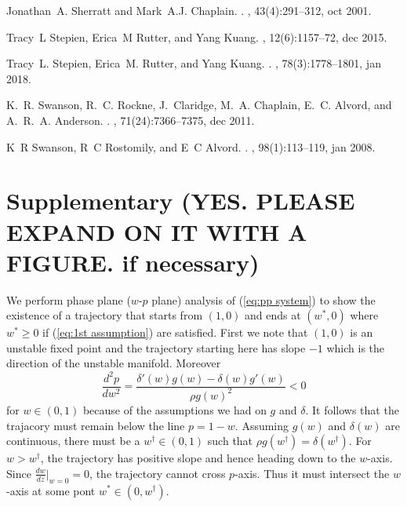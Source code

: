 \documentclass{aims}
\numberwithin{equation}{section}
\begin{document}
\begin{thebibliography}{10}
Jonathan~A. Sherratt and Mark~A.J. Chaplain.
.
, 43(4):291--312, oct 2001.

Tracy~L Stepien, Erica~M Rutter, and Yang Kuang.
, 12(6):1157--72,
  dec 2015.

Tracy~L. Stepien, Erica~M. Rutter, and Yang Kuang.
.
, 78(3):1778--1801, jan
  2018.

K.~R. Swanson, R.~C. Rockne, J.~Claridge, M.~A. Chaplain, E.~C. Alvord, and
  A.~R.~A. Anderson.
.
, 71(24):7366--7375, dec 2011.

K~R Swanson, R~C Rostomily, and E~C Alvord.
.
, 98(1):113--119, jan 2008.

\end{thebibliography}

\section*{Supplementary (YES. PLEASE EXPAND ON IT WITH A FIGURE. if necessary)}

We perform phase plane ($w$-$p$ plane) analysis of (\ref{eq:pp system})
to show the existence of a trajectory that starts from $(1,0)$ and
ends at $(w^{*},0)$ where $w^{*}\ge0$ if (\ref{eq:1st assumption})
are satisfied. First we note that $(1,0)$ is an unstable fixed point
and the trajectory starting here has slope $-1$ which is the direction
of the unstable manifold. Moreover 
\[
\frac{d^{2}p}{dw^{2}}=\frac{\delta'(w)g(w)-\delta(w)g'(w)}{\rho g(w)^{2}}<0
\]
for $w\in(0,1)$ because of the assumptions we had on $g$ and $\delta$.
It follows that the trajacory must remain below the line $p=1-w$.
Assuming $g(w)$ and $\delta(w)$ are continuous, there must be a
$w^{\dagger}\in(0,1)$ such that $\rho g(w^{\dagger})=\delta(w^{\dagger})$.
For $w>w^{\dagger}$, the trajectory has positive slope and hence
heading down to the $w$-axis. Since $\frac{dw}{dz}\vert_{w=0}=0$,
the trajectory cannot cross $p$-axis. Thus it must intersect the
$w$-axis at some pont $w^{*}\in(0,w^{\dagger}).$ 
\end{document}
